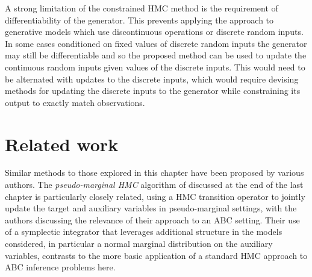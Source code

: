 A strong limitation of the constrained \ac{HMC} method is the requirement of differentiability of the generator. This prevents applying the approach to generative models which use discontinuous operations or discrete random inputs. In some cases conditioned on fixed values of discrete random inputs the generator may still be differentiable and so the proposed method can be used to update the continuous random inputs given values of the discrete inputs. This would need to be alternated with updates to the discrete inputs, which would require devising methods for updating the discrete inputs to the generator while constraining its output to exactly match observations.




\section{Related work}

Similar methods to those explored in this chapter have been proposed by various authors. The \emph{pseudo-marginal \ac{HMC}} algorithm of \citep{lindsten2016pseudo} discussed at the end of the last chapter is particularly closely related, using a \ac{HMC} transition operator to jointly update the target and auxiliary variables in pseudo-marginal settings, with the authors discussing the relevance of their approach to an \ac{ABC} setting. Their use of a symplectic integrator that leverages additional structure in the models considered, in particular a normal marginal distribution on the auxiliary variables, contrasts to the more basic application of a standard \ac{HMC} approach to \ac{ABC} inference problems here. 

